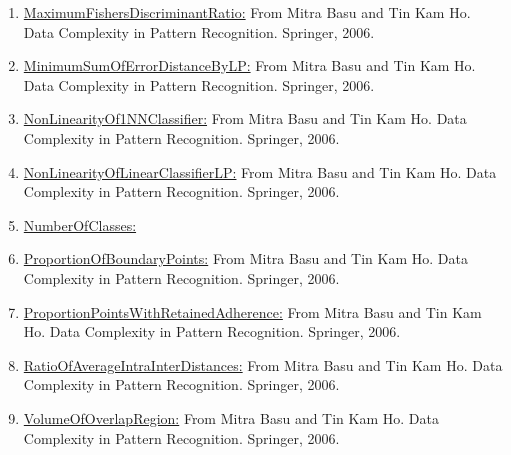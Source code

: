 \documentclass[a4paper,12pt, english]{article}
\begin{document}
\begin{enumerate}
				\item \underline{MaximumFishersDiscriminantRatio:}  From Mitra Basu and Tin Kam Ho. Data Complexity in Pattern Recognition. Springer, 2006.
				\item \underline{MinimumSumOfErrorDistanceByLP:}  From Mitra Basu and Tin Kam Ho. Data Complexity in Pattern Recognition. Springer, 2006.
				\item \underline{NonLinearityOf1NNClassifier:}  From Mitra Basu and Tin Kam Ho. Data Complexity in Pattern Recognition. Springer, 2006.
				\item \underline{NonLinearityOfLinearClassifierLP:}  From Mitra Basu and Tin Kam Ho. Data Complexity in Pattern Recognition. Springer, 2006.
				\item \underline{NumberOfClasses:}
				\item \underline{ProportionOfBoundaryPoints:}  From Mitra Basu and Tin Kam Ho. Data Complexity in Pattern Recognition. Springer, 2006.
				\item \underline{ProportionPointsWithRetainedAdherence:}  From Mitra Basu and Tin Kam Ho. Data Complexity in Pattern Recognition. Springer, 2006.
				\item \underline{RatioOfAverageIntraInterDistances:}  From Mitra Basu and Tin Kam Ho. Data Complexity in Pattern Recognition. Springer, 2006.
				\item \underline{VolumeOfOverlapRegion:}  From Mitra Basu and Tin Kam Ho. Data Complexity in Pattern Recognition. Springer, 2006.
				\end{enumerate}	  		
		
\end{document}
